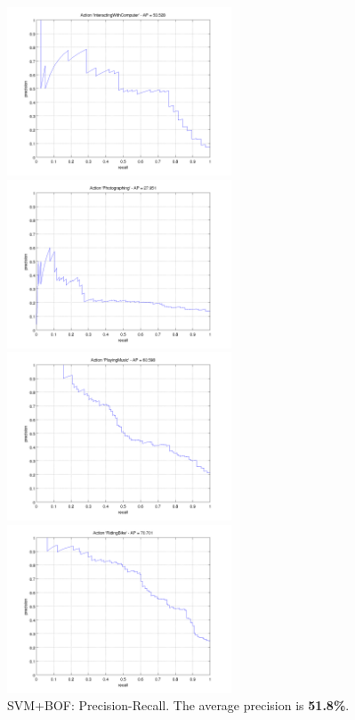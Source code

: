 \documentclass[10pt,a4paper]{llncs}
\begin{document}
\begin{figure}
\caption{SVM+BOF: Precision-Recall. The average precision is \textbf{51.8\%}.}
\label{fig:SVM_BOF_PR}
\begin{minipage}{0.5\linewidth}
\includegraphics[height=5cm]{img/SVM_BOF_PR_InteractingWithComputer.png}
\end{minipage}
\begin{minipage}{0.5\linewidth}
\includegraphics[height=5cm]{img/SVM_BOF_PR_Photographing.png}
\end{minipage}
\begin{minipage}{0.5\linewidth}
\includegraphics[height=5cm]{img/SVM_BOF_PR_PlayingMusic.png}
\end{minipage}
\begin{minipage}{0.5\linewidth}
\includegraphics[height=5cm]{img/SVM_BOF_PR_RidingBike.png}

\end{minipage}
\end{figure}
\end{document}
